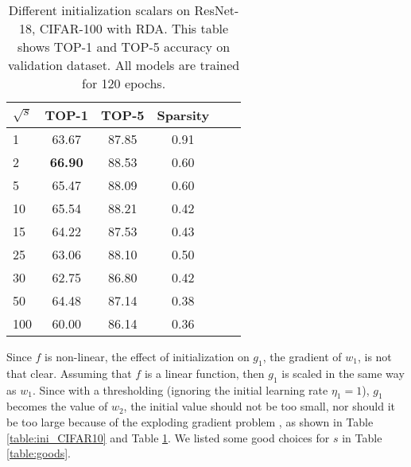 \begin{table}[tb]
	\caption{Different initialization scalars on ResNet-18, CIFAR-100 with RDA. 
		This table shows TOP-1 and TOP-5 accuracy on validation dataset. All models are trained for 120 epochs.}
	\label{table:ini_CIFAR100}
	\vskip 0.15in
	\begin{center}
		\begin{small}
				\begin{tabular}{lccccr}
					\hline
					$\sqrt{s}$ &  TOP-1 & TOP-5  &  Sparsity \\ 
					\hline
					1      &  63.67 &  87.85 &  0.91 \\
					2      &  \bf66.90 &  88.53 & 0.60  \\
					5      &  65.47 &  88.09 &  0.60 \\
					10     &  65.54 &  88.21 &  0.42 \\
					15     &  64.22 &  87.53 &  0.43 \\
					25     &  63.06 &  88.10 &  0.50 \\
					30     &  62.75 &  86.80 &  0.42 \\
					50     &  64.48 &  87.14 &  0.38   \\
					100    &  60.00 &  86.14 &  0.36  \\
					\hline
				\end{tabular}
		\end{small}
	\end{center}
\end{table}

Since $f$ is non-linear, the effect of initialization on $g_1$, the gradient of $w_1$, is not that clear. Assuming that $f$ is a linear function, then $g_1$ is scaled in the same way as $w_1$. Since with a thresholding (ignoring the initial learning rate $\eta_1=1$), $g_1$ becomes the value of $w_2$, the initial value should not be too small, nor should it be too large because of the exploding gradient problem \cite{pascanu2012understanding}, as shown in Table \ref{table:ini_CIFAR10} and Table \ref{table:ini_CIFAR100}. We listed some good choices for $s$ in Table \ref{table:goods}.


